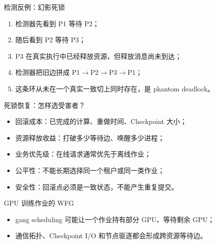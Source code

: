 \documentclass[UTF8,fontset=none,aspectratio=169,10pt]{beamer}
\begin{document}
\begin{frame}{检测反例：幻影死锁}
\begin{enumerate}
  \item 检测器先看到 P1 等待 P2；
  \item 随后看到 P2 等待 P3；
  \item P3 在真实执行中已经释放资源，但释放消息尚未到达；
  \item 检测器把旧边拼成 P1$\rightarrow$P2$\rightarrow$P3$\rightarrow$P1；
  \item 这条环从未在一个真实一致切上同时存在，是 phantom deadlock。
\end{enumerate}
\vfill
{}
\end{frame}

\begin{frame}{死锁恢复：怎样选受害者？}
\begin{itemize}
  \item 回滚成本：已完成的计算、重做时间、Checkpoint 大小；
  \item 资源释放收益：打破多少等待边、唤醒多少进程；
  \item 业务优先级：在线请求通常优先于离线作业；
  \item 公平性：不能长期选择同一个租户或同一类作业；
  \item 安全性：回滚点必须是一致状态，不能产生重复提交。
\end{itemize}
\end{frame}


\begin{frame}{GPU 训练作业的 WFG}
\begin{center}
\end{center}
\begin{itemize}
  \item gang scheduling 可能让一个作业持有部分 GPU、等待剩余 GPU；
  \item 通信拓扑、Checkpoint I/O 和节点驱逐都会形成跨资源等待边。
\end{itemize}
\end{frame}
\end{document}
